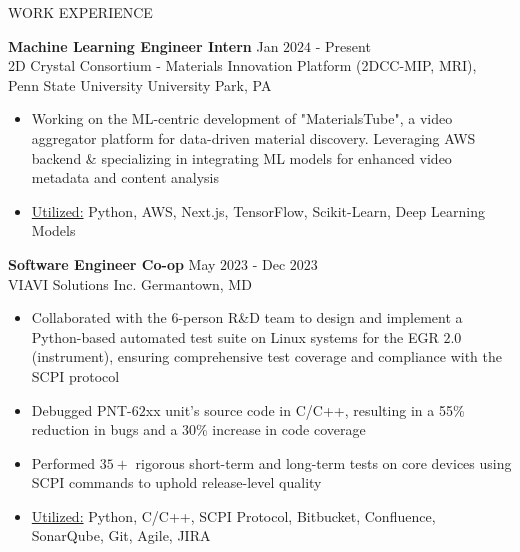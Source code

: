 \documentclass{resume} %
\begin{document}
\begin{rSection}{WORK EXPERIENCE}

{\bf Machine Learning Engineer Intern} \hfill Jan $2024$ - Present\\
2D Crystal Consortium - Materials Innovation Platform (2DCC-MIP, MRI), Penn State University \hfill University Park, PA
\begin{itemize}[itemsep = -4pt]
    \item Working on the ML-centric development of "MaterialsTube", a video aggregator platform for data-driven material discovery. Leveraging AWS backend \& specializing in integrating ML models for enhanced video metadata and content analysis
    \item \underline{Utilized:} Python, AWS, Next.js, TensorFlow, Scikit-Learn, Deep Learning Models 
\end{itemize}

{\bf Software Engineer Co-op} \hfill May $2023$ - Dec $2023$\\
VIAVI Solutions Inc. \hfill Germantown, MD
\begin{itemize}[itemsep = -4pt]
    \item Collaborated with the 6-person R\&D team to design and implement a Python-based automated test suite on Linux systems for the EGR $2.0$ (instrument), ensuring comprehensive test coverage and compliance with the SCPI protocol
    \item Debugged PNT-$62$xx unit's source code in C/C++, resulting in a 55\% reduction in bugs and a 30\% increase in code coverage
    \item Performed $35+$ rigorous short-term and long-term tests on core devices using SCPI commands to uphold release-level quality
    \item \underline{Utilized:} Python, C/C++, SCPI Protocol, Bitbucket, Confluence, SonarQube, Git, Agile, JIRA
\end{itemize}


\end{rSection}
\end{document}
